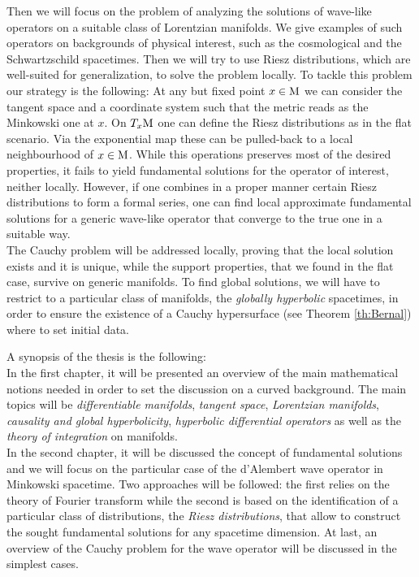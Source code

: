 \thispagestyle{plain}
\noindent Then we will focus on the problem of analyzing the solutions of wave-like operators on a suitable class of Lorentzian manifolds. We give examples of such operators on backgrounds of physical interest, such as the cosmological and the Schwartzschild spacetimes. Then we will try to use Riesz distributions, which are well-suited for generalization, to solve the problem locally. To tackle this problem our strategy is the following: At any but fixed point $x\in\mathrm{M}$ we can consider the tangent space and a coordinate system such that the metric reads as the Minkowski one at $x$. On $T_x\mathrm{M}$ one can define the Riesz distributions as in the flat scenario. Via the exponential map these can be pulled-back to a local neighbourhood of $x\in\mathrm{M}$. While this operations preserves most of the desired properties, it fails to yield fundamental solutions for the operator of interest, neither locally. However, if one combines in a proper manner certain Riesz distributions to form a formal series, one can find local approximate fundamental solutions for a generic wave-like operator that converge to the true one in a suitable way.\\
The Cauchy problem will be addressed locally, proving that the local solution exists and it is unique, while the support properties, that we found in the flat case, survive on generic manifolds. To find global solutions, we will have to restrict to a particular class of manifolds, the \emph{globally hyperbolic} spacetimes, in order to ensure the existence of a Cauchy hypersurface (see Theorem \ref{th:Bernal}) where to set initial data.\\[1.5cm]






\thispagestyle{plain}


\noindent A synopsis of the thesis is the following:\\
In the first chapter, it will be presented an overview of the main mathematical notions needed in order to set the discussion on a curved background. The main topics will be \emph{differentiable manifolds}, \emph{tangent space}, \emph{Lorentzian manifolds}, \emph{causality and global hyperbolicity}, \emph{hyperbolic differential operators} as well as the \emph{theory of integration} on manifolds.\\

\noindent In the second chapter, it will be discussed the concept of fundamental solutions and we will focus on the particular case of the d'Alembert wave operator in Minkowski spacetime. Two approaches will be followed: the first relies on the theory of Fourier transform while the second is based on the identification of a particular class of distributions, the \emph{Riesz distributions}, that allow to construct the sought fundamental solutions for any spacetime dimension. At last, an overview of the Cauchy problem for the wave operator will be discussed in the simplest cases.\\

